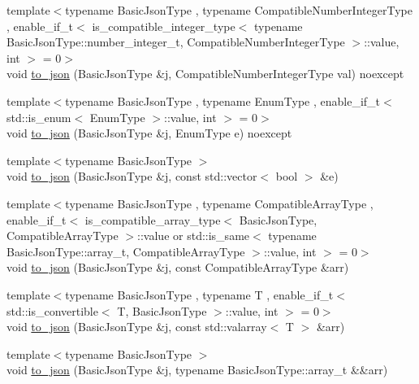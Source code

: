\begin{DoxyCompactItemize}
\item 
{\footnotesize template$<$typename Basic\+Json\+Type , typename Compatible\+Number\+Integer\+Type , enable\+\_\+if\+\_\+t$<$ is\+\_\+compatible\+\_\+integer\+\_\+type$<$ typename Basic\+Json\+Type\+::number\+\_\+integer\+\_\+t, Compatible\+Number\+Integer\+Type $>$\+::value, int $>$  = 0$>$ }\\void \hyperlink{namespacenlohmann_1_1detail_a91fe576be579c8c2fdd14610605c6dd2}{to\+\_\+json} (Basic\+Json\+Type \&j, Compatible\+Number\+Integer\+Type val) noexcept
\item 
{\footnotesize template$<$typename Basic\+Json\+Type , typename Enum\+Type , enable\+\_\+if\+\_\+t$<$ std\+::is\+\_\+enum$<$ Enum\+Type $>$\+::value, int $>$  = 0$>$ }\\void \hyperlink{namespacenlohmann_1_1detail_a0c8b159dba71981d6c555d284cf6e2bf}{to\+\_\+json} (Basic\+Json\+Type \&j, Enum\+Type e) noexcept
\item 
{\footnotesize template$<$typename Basic\+Json\+Type $>$ }\\void \hyperlink{namespacenlohmann_1_1detail_aeca6fb5fede5ed1e12a4420d98a5692b}{to\+\_\+json} (Basic\+Json\+Type \&j, const std\+::vector$<$ bool $>$ \&e)
\item 
{\footnotesize template$<$typename Basic\+Json\+Type , typename Compatible\+Array\+Type , enable\+\_\+if\+\_\+t$<$ is\+\_\+compatible\+\_\+array\+\_\+type$<$ Basic\+Json\+Type, Compatible\+Array\+Type $>$\+::value or std\+::is\+\_\+same$<$ typename Basic\+Json\+Type\+::array\+\_\+t, Compatible\+Array\+Type $>$\+::value, int $>$  = 0$>$ }\\void \hyperlink{namespacenlohmann_1_1detail_a3afebc132c5ff83f9cd160e52030fdfd}{to\+\_\+json} (Basic\+Json\+Type \&j, const Compatible\+Array\+Type \&arr)
\item 
{\footnotesize template$<$typename Basic\+Json\+Type , typename T , enable\+\_\+if\+\_\+t$<$ std\+::is\+\_\+convertible$<$ T, Basic\+Json\+Type $>$\+::value, int $>$  = 0$>$ }\\void \hyperlink{namespacenlohmann_1_1detail_a7f7c7b9760161b774cdc0b4b838fae64}{to\+\_\+json} (Basic\+Json\+Type \&j, const std\+::valarray$<$ T $>$ \&arr)
\item 
{\footnotesize template$<$typename Basic\+Json\+Type $>$ }\\void \hyperlink{namespacenlohmann_1_1detail_aa0fd1b5788e9ba37e31da43dda738cb5}{to\+\_\+json} (Basic\+Json\+Type \&j, typename Basic\+Json\+Type\+::array\+\_\+t \&\&arr)
\item 

\end{DoxyCompactItemize}
